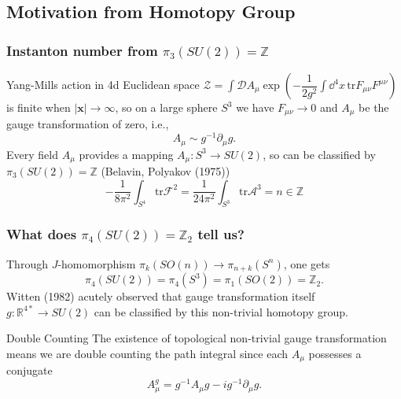 \documentclass[10pt,aspectratio=43,xcolor=x11names,t]{beamer}%
\begin{document}
	\subsection{Motivation from Homotopy Group}
	\begin{frame}
		\frametitle{Instanton number from $\pi_3(SU(2))=\mathbb{Z}$}
			Yang-Mills action in 4d Euclidean space $\displaystyle\mathcal{Z}=\int\mathcal{D}A_\mu\exp \left(-\dfrac{1}{2g^2}\int\dd^4x\,\mathrm{tr}F_{\mu\nu}F^{\mu\nu}\right)$ is finite when $|\bm{x}|\rightarrow \infty$, so on a large sphere $S^3$ we have $F_{\mu\nu}\rightarrow0$ and $A_\mu$ be the gauge transformation of zero, i.e.,
			\begin{equation*}
				A_\mu\sim g^{-1}\partial_\mu g.
			\end{equation*}
			\pause
			{\color{blue}Every field $A_\mu$ provides a mapping $A_\mu:S^3\rightarrow SU(2)$, so can be classified by $\pi_3(SU(2))=\mathbb{Z}$} (Belavin, Polyakov  (1975))
			\begin{equation*}
				-\dfrac{1}{8\pi^2}\int_{S^4}\mathrm{tr}\mathcal{F}^2=\dfrac{1}{24\pi^2}\int_{S^3}\mathrm{tr}\mathcal{A}^3=n\in\mathbb{Z}
			\end{equation*}
	\end{frame}
	\begin{frame}
		\frametitle{What does $\pi_4(SU(2))=\mathbb{Z}_2$ tell us?}
		Through $J$-homomorphism $\pi_k(SO(n))\rightarrow\pi_{n+k}(S^n)$, one gets
		\begin{equation*}
			\pi_4(SU(2))=\pi_4(S^3)=\pi_1(SO(2))=\mathbb{Z}_2.
		\end{equation*}
		Witten (1982) acutely observed that gauge transformation itself $g:\mathbb{R}^{4*}\rightarrow SU(2)$ can be classified by this non-trivial homotopy group.\pause
		\begin{block}{Double Counting}
			The existence of topological non-trivial gauge transformation means we are {\color{red}double counting} the path integral since each $A_\mu$ possesses a conjugate
			\begin{equation*}
				A_\mu^g=g^{-1}A_\mu g-ig^{-1}\partial_\mu g.
			\end{equation*}
		\end{block}
	\end{frame}
\end{document}
